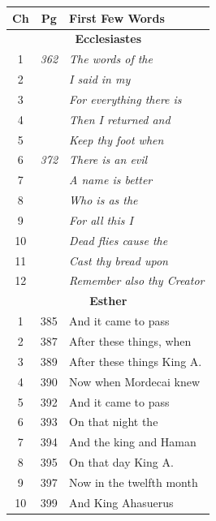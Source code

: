 \documentclass{article}
\newlength{\minipageheight}
\newlength{\minipagewidth}
\begin{document}
\begin{minipage}[r][\minipageheight][t]{\minipagewidth}%
    \renewcommand{\arraystretch}{0.95}
    \begin{longtable}{ccl}
        \textbf{Ch} & \textbf{Pg}  & \textbf{First Few Words}           \\%
        \hline%
        \endfirsthead%

        \multicolumn{3}{c}{\textbf{Ecclesiastes}}                       \\
        \hline
        1           & \textit{362} & \textit{The words of the}          \\
        2           &              & \textit{I said in my}              \\
        3           &              & \textit{For everything there is}   \\
        4           &              & \textit{Then I returned and}       \\
        5           &              & \textit{Keep thy foot when}        \\
        6           & \textit{372} & \textit{There is an evil}          \\
        7           &              & \textit{A name is better}          \\
        8           &              & \textit{Who is as the}             \\
        9           &              & \textit{For all this I}            \\
        10          &              & \textit{Dead flies cause the}      \\
        11          &              & \textit{Cast thy bread upon}       \\
        12          &              & \textit{Remember also thy Creator} \\

        \multicolumn{3}{c}{\textbf{Esther}}                             \\
        \hline
        1           & 385          & And it came to pass                \\
        2           & 387          & After these things, when           \\
        3           & 389          & After these things King A.         \\
        4           & 390          & Now when Mordecai knew             \\
        5           & 392          & And it came to pass                \\
        6           & 393          & On that night the                  \\
        7           & 394          & And the king and Haman             \\
        8           & 395          & On that day King A.                \\
        9           & 397          & Now in the twelfth month           \\
        10          & 399          & And King Ahasuerus                 \\


\end{longtable}
\end{minipage}
\end{document}
